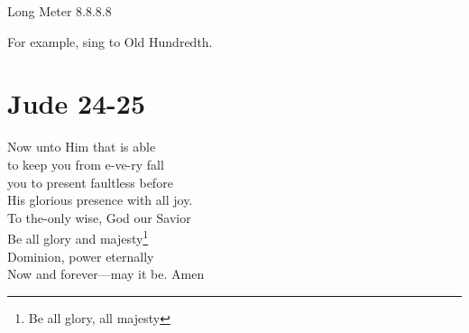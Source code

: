\documentclass{article}
\begin{document}
\noindent Long Meter 8.8.8.8

\noindent For example, sing to Old Hundredth.

\section*{Jude 24-25}

 Now unto Him that is able\\
to keep you from e-ve-ry fall\\
you to present faultless before\\
His glorious presence with all joy.\\

 To the-only wise, God our Savior\\
Be all glory and majesty\footnote{Be all glory, all majesty}\\
Dominion, power eternally\\
Now and forever---may it be. Amen\\
\end{document}
